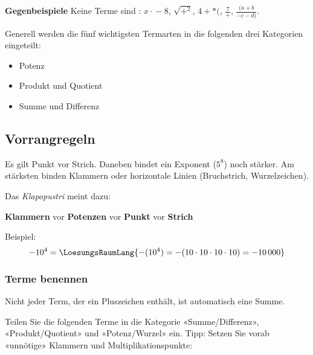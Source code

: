\textbf{Gegenbeispiele}
Keine Terme sind \zB{}: $x \cdot{}-8$, $\sqrt{+^2}$, $4+*($, $\frac{7}{+}$, $\frac{(a+b}{-c-d)}$.

Generell werden die fünf wichtigsten Termarten in die folgenden drei Kategorien eingeteilt:
\begin{itemize}
\item Potenz
\item Produkt und Quotient
\item Summe und Differenz
\end{itemize}


\newpage

\subsection{Vorrangregeln}

Es gilt Punkt vor Strich. Daneben bindet ein Exponent (\zB $5^8$) noch
stärker. Am stärksten binden Klammern oder horizontale Linien
(Bruchstrich, Wurzelzeichen).

\begin{center}
  Das \textit{Klapopustri} meint dazu:

  \textbf{Klammern} vor \textbf{Potenzen} vor \textbf{Punkt} vor
  \textbf{Strich}
  
\end{center}




Beispiel:
$$-10^4 = \LoesungsRaumLang{-(10^4) = -
  (10\cdot{}10\cdot{}10\cdot{}10) = -10\,000}$$
\newpage

\subsubsection{Terme benennen}
Nicht jeder Term, der ein Pluszeichen enthält, ist automatisch eine
Summe.

Teilen Sie die folgenden Terme in die Kategorie «Summe/Differenz»,
«Produkt/Quotient» und «Potenz/Wurzel» ein. Tipp: Setzen Sie vorab
«unnötige» Klammern und Multiplikationspunkte:


